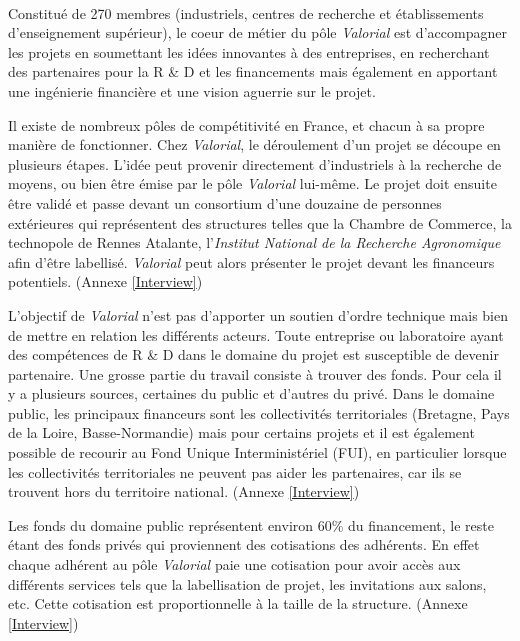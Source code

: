 \documentclass[a4paper,12pt]{report}
\begin{document}
			 \paragraph{}Constitué de 270 membres (industriels, centres de recherche et établissements d’enseignement supérieur), le coeur de métier du pôle \textit{Valorial} est d’accompagner les projets en soumettant les idées innovantes à des entreprises, en recherchant des partenaires pour la R \& D et les financements mais également en apportant une ingénierie financière et une vision aguerrie sur le projet. 
			
			 Il existe de nombreux pôles de compétitivité en France, et chacun à sa propre manière de fonctionner. Chez \textit{Valorial}, le déroulement d’un projet se découpe en plusieurs étapes. L’idée peut provenir directement d’industriels à la recherche de moyens, ou bien être émise par le pôle \textit{Valorial} lui-même. Le projet doit ensuite être validé et passe devant un consortium d’une douzaine de personnes extérieures qui représentent des structures telles que la Chambre de Commerce, la technopole de Rennes Atalante, l’\textit{Institut National de la Recherche Agronomique} afin d’être labellisé. \textit{Valorial} peut alors présenter le projet devant les financeurs potentiels. (Annexe \ref{Interview})

			L’objectif de \textit{Valorial} n’est pas d’apporter un soutien d’ordre technique mais bien de mettre en relation les différents acteurs. Toute entreprise ou laboratoire ayant des compétences de R \& D dans le domaine du projet est susceptible de devenir partenaire. Une grosse partie du travail consiste à trouver des fonds. Pour cela il y a plusieurs sources, certaines du public et d’autres du privé. Dans le domaine public, les principaux financeurs sont les collectivités territoriales (Bretagne, Pays de la Loire, Basse-Normandie) mais pour certains projets et il est également possible de recourir au Fond Unique Interministériel (FUI), en particulier lorsque les collectivités territoriales ne peuvent pas aider les partenaires, car ils se trouvent hors du territoire national. (Annexe \ref{Interview})

			Les fonds du domaine public représentent environ 60\% du financement, le reste étant des fonds privés qui proviennent des cotisations des adhérents. En effet chaque adhérent au pôle \textit{Valorial} paie une cotisation pour avoir accès aux différents services tels que la labellisation de projet, les invitations aux salons, etc. Cette cotisation est proportionnelle à la taille de la structure. (Annexe \ref{Interview})
    
\end{document}
